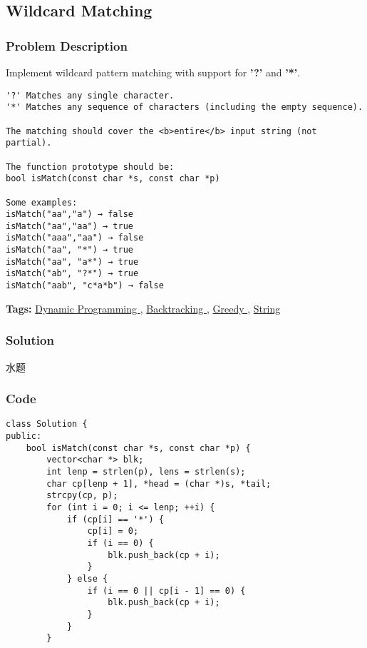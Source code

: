 \documentclass{article}
\begin{document}
\begin{CJK*}{UTF8}{gkai}
\subsection{ Wildcard Matching }
\label{ Wildcard Matching }

\subsubsection*{Problem Description}
Implement wildcard pattern matching with support for \textbf{'?'} and \textbf{'*'}.

\begin{verbatim}
'?' Matches any single character.
'*' Matches any sequence of characters (including the empty sequence).

The matching should cover the <b>entire</b> input string (not partial).

The function prototype should be:
bool isMatch(const char *s, const char *p)

Some examples:
isMatch("aa","a") → false
isMatch("aa","aa") → true
isMatch("aaa","aa") → false
isMatch("aa", "*") → true
isMatch("aa", "a*") → true
isMatch("ab", "?*") → true
isMatch("aab", "c*a*b") → false
\end{verbatim}

\textbf{Tags: }
\hyperref[ Dynamic Programming ]{ Dynamic Programming },  \hyperref[ Backtracking ]{ Backtracking },  \hyperref[ Greedy ]{ Greedy },  \hyperref[ String ]{ String }



\subsubsection*{Solution}
水题

\subsubsection*{Code}
\begin{lstlisting}
class Solution {
public:
    bool isMatch(const char *s, const char *p) {
        vector<char *> blk;
        int lenp = strlen(p), lens = strlen(s);
        char cp[lenp + 1], *head = (char *)s, *tail;
        strcpy(cp, p);
        for (int i = 0; i <= lenp; ++i) {
            if (cp[i] == '*') {
                cp[i] = 0;
                if (i == 0) {
                    blk.push_back(cp + i);
                }
            } else {
                if (i == 0 || cp[i - 1] == 0) {
                    blk.push_back(cp + i);
                }
            }
        }
        

\end{lstlisting}
\end{CJK*}
\end{document}

